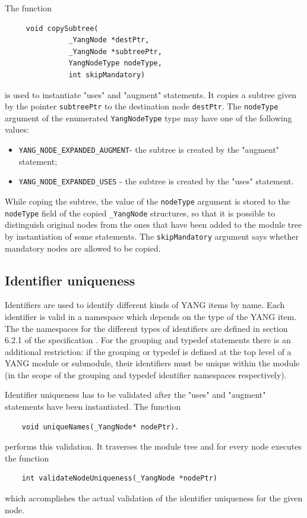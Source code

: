 \documentclass[conference]{IEEEtran}
\begin{document}
The function
\small
\begin{verbatim}
     void copySubtree(
               _YangNode *destPtr, 
               _YangNode *subtreePtr, 
               YangNodeType nodeType, 
               int skipMandatory)
\end{verbatim}
\normalsize
is used to instantiate "uses" and "augment" statements. It copies a subtree given by the pointer \texttt{subtreePtr} to the destination node \texttt{destPtr}.  
The \texttt{nodeType} argument of the enumerated \texttt{YangNodeType} type  may have one of the following values:
\begin{itemize}
\item \texttt{YANG\_NODE\_EXPANDED\_AUGMENT}- the subtree is created by the "augment" statement;
\item \texttt{YANG\_NODE\_EXPANDED\_USES} - the subtree is created by the "uses" statement.
\end{itemize}
While coping the subtree, the value of the \texttt{nodeType} argument is stored to the \texttt{nodeType} field of the copied \texttt{\_YangNode} structures,
so that it is possible to distinguish original nodes from the ones that have been added to the module tree by instantiation of some statements. 
The \texttt{skipMandatory} argument says whether mandatory nodes are allowed to be copied.

\subsection{Identifier uniqueness}
Identifiers are used to identify different kinds of YANG items by name. Each identifier is valid in a namespace which depends on the type of the YANG item.
The the namespaces for the different types of identifiers are defined in section 6.2.1 of the specification \cite{bib4}. For the grouping and typedef statements
there is an additional restriction: if the grouping or typedef is defined at the top level of a YANG module or submodule, their identifiers
must be unique within the module (in the scope of the grouping and typedef identifier namespaces respectively).

Identifier uniqueness has to be validated after the "uses" and "augment" statements have been instantiated. The function
\small
\begin{verbatim}
    void uniqueNames(_YangNode* nodePtr).
\end{verbatim}
\normalsize
performs this validation. It traverses the module tree and for every node executes the function  
\small
\begin{verbatim}
    int validateNodeUniqueness(_YangNode *nodePtr)
\end{verbatim}
\normalsize
which accomplishes the actual validation of the identifier uniqueness for the given node. 
\end{document}

